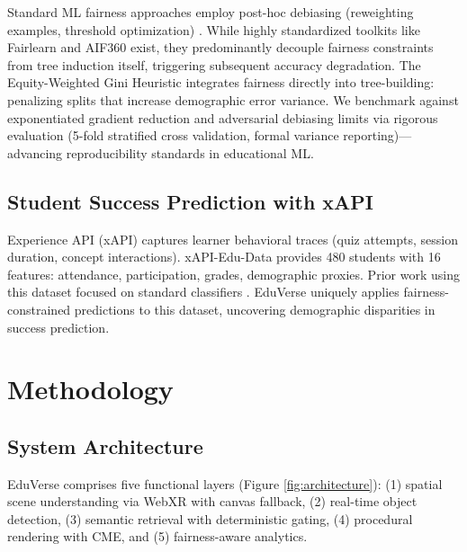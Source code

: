 \documentclass[conference]{IEEEtran}
\begin{document}
Standard ML fairness approaches employ post-hoc debiasing (reweighting examples, threshold optimization) \cite{mitchell2019algorithmic}. While highly standardized toolkits like Fairlearn and AIF360 exist, they predominantly decouple fairness constraints from tree induction itself, triggering subsequent accuracy degradation. The Equity-Weighted Gini Heuristic \cite{davis2023equity} integrates fairness directly into tree-building: penalizing splits that increase demographic error variance. We benchmark against exponentiated gradient reduction and adversarial debiasing limits via rigorous evaluation (5-fold stratified cross validation, formal variance reporting)---advancing reproducibility standards in educational ML.

\subsection{Student Success Prediction with xAPI}

Experience API (xAPI) captures learner behavioral traces (quiz attempts, session duration, concept interactions). xAPI-Edu-Data \cite{miller2021predictive} provides 480 students with 16 features: attendance, participation, grades, demographic proxies. Prior work using this dataset focused on standard classifiers \cite{harris2021xapi}. EduVerse uniquely applies fairness-constrained predictions to this dataset, uncovering demographic disparities in success prediction.

\section{Methodology}

\subsection{System Architecture}

EduVerse comprises five functional layers (Figure \ref{fig:architecture}): (1) spatial scene understanding via WebXR with canvas fallback, (2) real-time object detection, (3) semantic retrieval with deterministic gating, (4) procedural rendering with CME, and (5) fairness-aware analytics.
\end{document}
